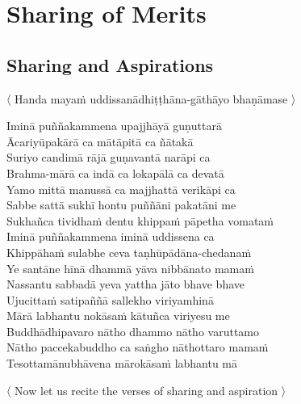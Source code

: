 
\chapter{Sharing of Merits}

\setsecheadstyle{\sectionFmt}

\section{Sharing and Aspirations}
\label{uddissanadhitthana}

\begin{leader}
  〈 Handa mayaṁ uddissanādhiṭṭhāna-gāthāyo bhaṇāmase 〉
\end{leader}

Iminā puññakammena upajjhāyā guṇuttarā\\
Ācariyūpakārā ca mātāpitā ca ñātakā\\
Suriyo candimā rājā guṇavantā narāpi ca\\
Brahma-mārā ca indā ca lokapālā ca devatā\\
Yamo mittā manussā ca majjhattā verikāpi ca\\
Sabbe sattā sukhī hontu puññāni pakatāni me\\
Sukhañca tividhaṁ dentu khippaṁ pāpetha vomataṁ\\
Iminā puññakammena iminā uddissena ca\\
Khippāhaṁ sulabhe ceva taṇhūpādāna-chedanaṁ\\
Ye santāne hīnā dhammā yāva nibbānato mamaṁ\\
Nassantu sabbadā yeva yattha jāto bhave bhave\\
Ujucittaṁ satipaññā sallekho viriyamhinā\\
Mārā labhantu nokāsaṁ kātuñca viriyesu me\\
Buddhādhipavaro nātho dhammo nātho varuttamo\\
Nātho paccekabuddho ca saṅgho nāthottaro mamaṁ\\
Tesottamānubhāvena mārokāsaṁ labhantu mā


\clearpage


\begin{leader-english}
  〈 \label{sharing-aspirations} Now let us recite the verses of sharing and aspiration 〉
\end{leader-english}

